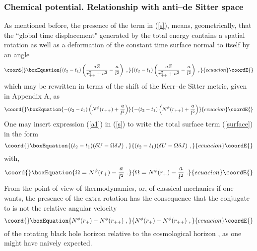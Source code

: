 \documentclass[a4paper,preprintnumbers,amsmath,amssymb]{revtex4}
\begin{document}
\subsubsection*{Chemical potential. Relationship with anti--de Sitter space}

As mentioned before, the presence of the \coordHE{} term in (\ref{s}), means, geometrically,
that the ``global time displacement" generated by the total energy \coordHE{} contains a spatial rotation as well as a deformation
of the constant time surface normal to itself by an angle
\begin{equation}\coord{}\boxEquation{
 (t_2-t_1) \left(\frac{aZ}{r_{++}^2+a^2} - \frac{a}{l^2}  \right) \ ,
\label{a1}
}{
 (t_2-t_1) \left(\frac{aZ}{r_{++}^2+a^2} - \frac{a}{l^2}  \right) \ ,
}{ecuacion}\coordE{}\end{equation}
which may be rewritten in terms of the shift \coordHE{} of the Kerr--de Sitter metric,
given in Appendix A, as
\begin{equation}\coord{}\boxEquation{
-(t_2-t_1) \left(N^{\phi}(r_{++}) + \frac{a}{l^2}\right)
\label{a2}
}{
-(t_2-t_1) \left(N^{\phi}(r_{++}) + \frac{a}{l^2}\right)
}{ecuacion}\coordE{}\end{equation}
One may insert expression (\ref{a1}) in (\ref{s}) to write the total surface term (\ref{surface}) in the form
\begin{equation}\coord{}\boxEquation{
(t_2-t_1)(\delta U - \Omega \delta J) \ ,
\label{surface2}
}{
(t_2-t_1)(\delta U - \Omega \delta J) \ ,
}{ecuacion}\coordE{}\end{equation}
with,
\begin{equation}\coord{}\boxEquation{
\Omega = N^{\phi}(r_+) - \frac{a}{l^2} \ .
\label{omega}
}{
\Omega = N^{\phi}(r_+) - \frac{a}{l^2} \ .
}{ecuacion}\coordE{}\end{equation}
From the point of view of thermodynamics, or, of  classical mechanics if one wants, the presence of the extra rotation has the consequence that the conjugate \myHighlight{$\Omega$}\coordHE{} to \coordHE{} is not the relative angular velocity
\begin{equation}\coord{}\boxEquation{
N^{\phi}(r_{+}) - N^{\phi}(r_{++}) \ ,
\label{dif}
}{
N^{\phi}(r_{+}) - N^{\phi}(r_{++}) \ ,
}{ecuacion}\coordE{}\end{equation}
of the rotating black hole horizon \coordHE{} relative to the cosmological horizon \coordHE{}, as one might have naively expected.
\end{document}
